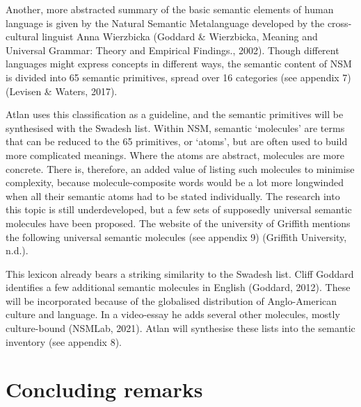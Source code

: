 Another, more abstracted summary of the basic semantic elements of human language is given by the Natural Semantic Metalanguage developed by the cross-cultural linguist Anna Wierzbicka (Goddard \& Wierzbicka, Meaning and Universal Grammar: Theory and Empirical Findings., 2002). Though different languages might express concepts in different ways, the semantic content of NSM is divided into 65 semantic primitives, spread over 16 categories (see appendix 7) (Levisen \& Waters, 2017). 

Atlan uses this classification as a guideline, and the semantic primitives will be synthesised with the Swadesh list. Within NSM, semantic ‘molecules’ are terms that can be reduced to the 65 primitives, or ‘atoms’, but are often used to build more complicated meanings. Where the atoms are abstract, molecules are more concrete. There is, therefore, an added value of listing such molecules to minimise complexity, because molecule-composite words would be a lot more longwinded when all their semantic atoms had to be stated individually. The research into this topic is still underdeveloped, but a few sets of supposedly universal semantic molecules have been proposed. The website of the university of Griffith mentions the following universal semantic molecules (see appendix 9) (Griffith University, n.d.).  

This lexicon already bears a striking similarity to the Swadesh list. Cliff Goddard identifies a few additional semantic molecules in English (Goddard, 2012). These will be incorporated because of the globalised distribution of Anglo-American culture and language. In a video-essay he adds several other molecules, mostly culture-bound  (NSMLab, 2021). Atlan will synthesise these lists into the semantic inventory (see appendix 8).  

 

\section{Concluding remarks}

